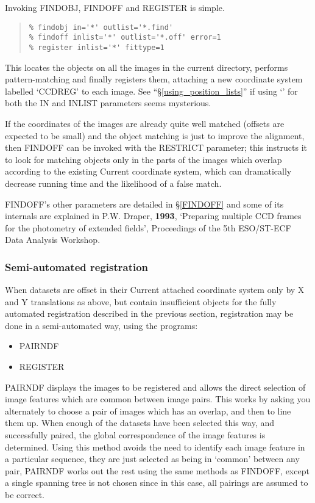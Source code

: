 \documentclass[twoside,11pt]{article}
\newcommand{\hyperref}[4]{#2\ref{#4}#3}
\newcommand{\htmlref}[2]{#1}
\newcommand{\latexhtml}[2]{#1}
\newcommand{\xlabel}[1]{}
\renewcommand{\_}{\texttt{\symbol{95}}}
\newcommand{\ttsize}{\latexhtml{\small}{}}
\newenvironment{myquote}{\begin{quote}\ttsize}{\end{quote}}
\newcommand{\text}[1]{{\ttsize \tt #1}}
\newcommand{\routine}[1]{{\sc #1}}
\newcommand{\xroutine}[1]{\htmlref{{\sc #1}}{#1}}
\begin{document}
Invoking \xroutine{FINDOBJ}, \xroutine{FINDOFF} and
\xroutine{REGISTER} is simple.
\begin{myquote}
\begin{verbatim}
% findobj in='*' outlist='*.find'
% findoff inlist='*' outlist='*.off' error=1
% register inlist='*' fittype=1
\end{verbatim}
\end{myquote}
This locates the objects on all the images in the current directory,
performs pattern-matching and finally registers them, attaching
a new coordinate system labelled `CCD\_REG' to each image.
See ``\hyperref{Using position lists}{\S}{}{using_position_lists}''
if using `\text{*}' for both the IN and INLIST
parameters seems mysterious.

If the coordinates of the images are already quite well matched
(offsets are expected to be small) 
and the object matching is just to improve the alignment,
then \routine{FINDOFF} can be invoked with the RESTRICT parameter;
this instructs it to look for matching objects only in the
parts of the images which overlap according to the existing
Current coordinate system, which can dramatically decrease running time 
and the likelihood of a false match.

\routine{FINDOFF}'s other parameters are detailed in
\hyperref{a later section}{\S}{}{FINDOFF} and some of its internals are
explained in P.W. Draper, {\bf 1993}, `Preparing multiple CCD frames for the
photometry of extended fields', Proceedings of the 5th ESO/ST-ECF Data
Analysis Workshop.



\subsubsection{\xlabel{semiautomated}\label{semiautomated}Semi-automated
               registration}

When datasets are offset in their Current attached coordinate system
only by X and Y translations as above,
but contain insufficient objects for the fully automated registration
described in the previous section, 
registration may be done in a semi-automated way,
using the programs:
\begin{itemize}
\item \xroutine{PAIRNDF}
\item \xroutine{REGISTER}
\end{itemize}

\routine{PAIRNDF} displays the images to be registered and allows the direct
selection of image features which are common between image pairs.
This works by asking you alternately to choose a pair of images
which has an overlap, and then to line them up.
When enough of the datasets have been selected this way, and
successfully paired, the global correspondence of the image features
is determined. Using this method avoids the need to identify each
image feature in a particular sequence, they are just selected as
being in `common' between any pair, \routine{PAIRNDF} works out the rest using
the same methods as \xroutine{FINDOFF}, except a single spanning tree is not
chosen since in this case, all pairings are assumed to be correct.
\end{document}
